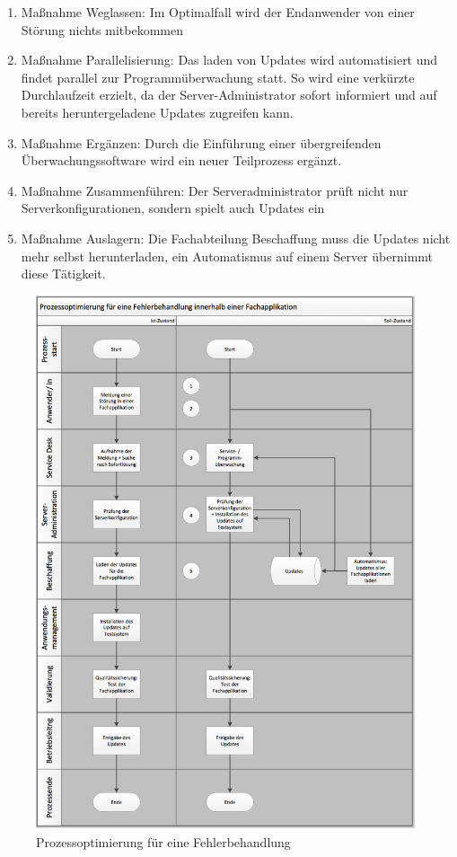 \begin{enumerate}
    \item Maßnahme Weglassen: Im Optimalfall wird der Endanwender von einer Störung nichts mitbekommen
    \item Maßnahme Parallelisierung: Das laden von Updates wird automatisiert und findet parallel zur Programmüberwachung statt. So wird eine verkürzte Durchlaufzeit erzielt, da der Server-Administrator sofort informiert und auf bereits heruntergeladene Updates zugreifen kann.
    \item Maßnahme Ergänzen: Durch die Einführung einer übergreifenden Überwachungssoftware wird ein neuer Teilprozess ergänzt.
    \item Maßnahme Zusammenführen: Der Serveradministrator prüft nicht nur Serverkonfigurationen, sondern spielt auch Updates ein
    \item Maßnahme Auslagern: Die Fachabteilung Beschaffung muss die Updates nicht mehr selbst herunterladen, ein Automatismus auf einem Server übernimmt diese Tätigkeit.
\end{enumerate}


\begin{figure}[h!]
	\centering
	\includegraphics[width=16cm]{kapitel/gruppe1_2/bilder/prozessoptimierung} 
	\caption{Prozessoptimierung für eine Fehlerbehandlung}
	\label{fig_prozessoptimierung}
\end{figure}


